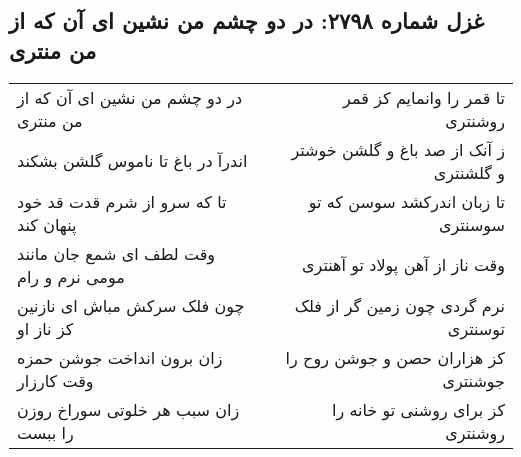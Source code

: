 \begin{center}
\section*{غزل شماره ۲۷۹۸: در دو چشم من نشین ای آن که از من منتری}
\label{sec:2798}
\begin{longtable}{l p{0.5cm} r}
در دو چشم من نشین ای آن که از من منتری
&&
تا قمر را وانمایم کز قمر روشنتری
\\
اندرآ در باغ تا ناموس گلشن بشکند
&&
ز آنک از صد باغ و گلشن خوشتر و گلشنتری
\\
تا که سرو از شرم قدت قد خود پنهان کند
&&
تا زبان اندرکشد سوسن که تو سوسنتری
\\
وقت لطف ای شمع جان مانند مومی نرم و رام
&&
وقت ناز از آهن پولاد تو آهنتری
\\
چون فلک سرکش مباش ای نازنین کز ناز او
&&
نرم گردی چون زمین گر از فلک توسنتری
\\
زان برون انداخت جوشن حمزه وقت کارزار
&&
کز هزاران حصن و جوشن روح را جوشنتری
\\
زان سبب هر خلوتی سوراخ روزن را ببست
&&
کز برای روشنی تو خانه را روشنتری
\\
\end{longtable}
\end{center}

